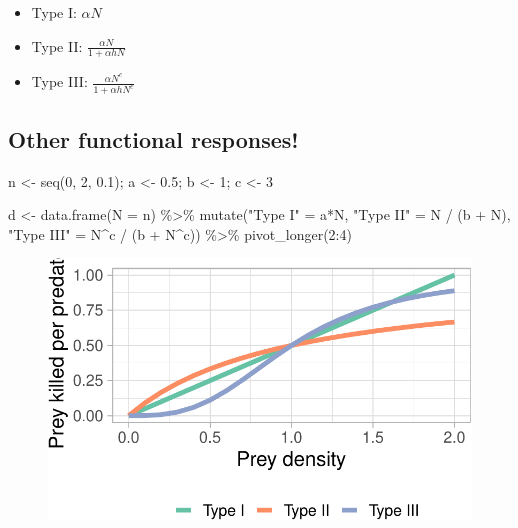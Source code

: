\documentclass[
  letterpaper,
  DIV=11,
  numbers=noendperiod]{scrartcl}
\newenvironment{Shaded}{\begin{snugshade}}{\end{snugshade}}
\newcommand{\AttributeTok}[1]{\textcolor[rgb]{0.40,0.45,0.13}{#1}}
\newcommand{\DecValTok}[1]{\textcolor[rgb]{0.68,0.00,0.00}{#1}}
\newcommand{\FloatTok}[1]{\textcolor[rgb]{0.68,0.00,0.00}{#1}}
\newcommand{\FunctionTok}[1]{\textcolor[rgb]{0.28,0.35,0.67}{#1}}
\newcommand{\NormalTok}[1]{\textcolor[rgb]{0.00,0.23,0.31}{#1}}
\newcommand{\OtherTok}[1]{\textcolor[rgb]{0.00,0.23,0.31}{#1}}
\newcommand{\SpecialCharTok}[1]{\textcolor[rgb]{0.37,0.37,0.37}{#1}}
\newcommand{\StringTok}[1]{\textcolor[rgb]{0.13,0.47,0.30}{#1}}
\begin{document}
\begin{itemize}
\item
  Type I: \(\alpha N\)
\item
  Type II: \(\frac {\alpha N}{1+\alpha h N}\)
\item
  Type III: \(\frac {\alpha N^c}{1+\alpha h N^c}\)
\end{itemize}

\hypertarget{other-functional-responses-1}{%
\subsection{Other functional
responses!}\label{other-functional-responses-1}}

\begin{Shaded}
\begin{Highlighting}[]
\NormalTok{n }\OtherTok{\textless{}{-}} \FunctionTok{seq}\NormalTok{(}\DecValTok{0}\NormalTok{, }\DecValTok{2}\NormalTok{, }\FloatTok{0.1}\NormalTok{); a }\OtherTok{\textless{}{-}} \FloatTok{0.5}\NormalTok{; b }\OtherTok{\textless{}{-}} \DecValTok{1}\NormalTok{; c }\OtherTok{\textless{}{-}} \DecValTok{3}

\NormalTok{d }\OtherTok{\textless{}{-}} \FunctionTok{data.frame}\NormalTok{(}\AttributeTok{N =}\NormalTok{ n) }\SpecialCharTok{\%\textgreater{}\%} 
  \FunctionTok{mutate}\NormalTok{(}\StringTok{"Type I"} \OtherTok{=}\NormalTok{ a}\SpecialCharTok{*}\NormalTok{N,}
         \StringTok{"Type II"} \OtherTok{=}\NormalTok{ N }\SpecialCharTok{/}\NormalTok{ (b }\SpecialCharTok{+}\NormalTok{ N),}
         \StringTok{"Type III"} \OtherTok{=}\NormalTok{ N}\SpecialCharTok{\^{}}\NormalTok{c }\SpecialCharTok{/}\NormalTok{ (b }\SpecialCharTok{+}\NormalTok{ N}\SpecialCharTok{\^{}}\NormalTok{c)) }\SpecialCharTok{\%\textgreater{}\%} 
  \FunctionTok{pivot\_longer}\NormalTok{(}\DecValTok{2}\SpecialCharTok{:}\DecValTok{4}\NormalTok{)}
\end{Highlighting}
\end{Shaded}

\begin{figure}

{\centering \includegraphics{ecological_interactions_files/figure-pdf/unnamed-chunk-16-1.pdf}

}

\end{figure}
\end{document}
